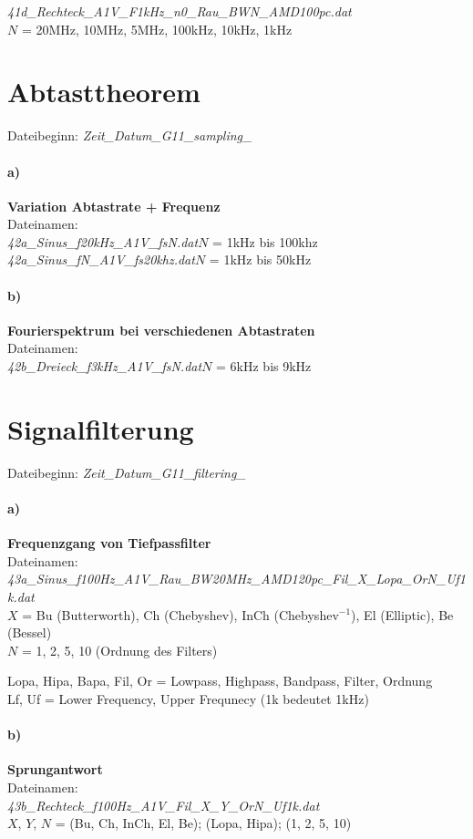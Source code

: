 \textit{41d\_Rechteck\_A1V\_F1kHz\_n0\_Rau\_BWN\_AMD100pc.dat} \\$N$ = 20MHz, 10MHz, 5MHz, 100kHz, 10kHz, 1kHz
\newpage
\section*{Abtasttheorem}
Dateibeginn: \textit{Zeit\_Datum\_G11\_sampling\_}
\paragraph{a)}\textbf{Variation Abtastrate + Frequenz}\\
Dateinamen:\\
\textit{42a\_Sinus\_f20kHz\_A1V\_fsN.dat}\tab $N$ = 1kHz bis 100khz\\
\textit{42a\_Sinus\_fN\_A1V\_fs20khz.dat}\tab $N$ = 1kHz bis 50kHz

\paragraph{b)}\textbf{Fourierspektrum bei verschiedenen Abtastraten}\\
Dateinamen:\\
\textit{42b\_Dreieck\_f3kHz\_A1V\_fsN.dat}\tab $N$ = 6kHz bis 9kHz

\section*{Signalfilterung}
Dateibeginn: \textit{Zeit\_Datum\_G11\_filtering\_}
\paragraph{a)}\textbf{Frequenzgang von Tiefpassfilter}\\
Dateinamen:\\
\textit{43a\_Sinus\_f100Hz\_A1V\_Rau\_BW20MHz\_AMD120pc\_Fil\_X\_Lopa\_OrN\_Uf1k.dat}\\
$X$ = Bu (Butterworth), Ch (Chebyshev), InCh (Chebyshev$^{-1}$), El (Elliptic), Be (Bessel)\\
$N$ = 1, 2, 5, 10 (Ordnung des Filters)

Lopa, Hipa, Bapa, Fil, Or = Lowpass, Highpass, Bandpass, Filter, Ordnung\\
Lf, Uf = Lower Frequency, Upper Frequnecy (1k bedeutet 1kHz)

\paragraph{b)}\textbf{Sprungantwort}\\
Dateinamen:\\
\textit{43b\_Rechteck\_f100Hz\_A1V\_Fil\_X\_Y\_OrN\_Uf1k.dat}\\
$X$, $Y$, $N$ = (Bu, Ch, InCh, El, Be); (Lopa, Hipa); (1, 2, 5, 10)
\newpage
